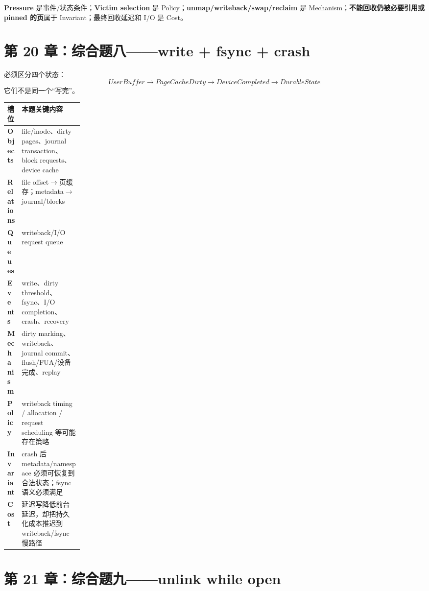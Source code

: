 \documentclass[11pt,a4paper]{ctexart}
\newcommand{\kw}[1]{\textbf{#1}}
\begin{document}
\begin{corebox}[最关键的分工]
\kw{Pressure} 是事件/状态条件；\kw{Victim selection} 是 Policy；\kw{unmap/writeback/swap/reclaim} 是 Mechanism；\kw{不能回收仍被必要引用或 pinned 的页}属于 Invariant；最终回收延迟和 I/O 是 Cost。
\end{corebox}

\section{第 20 章：综合题八——write + fsync + crash}

必须区分四个状态：
\[
\boxed{UserBuffer\rightarrow PageCacheDirty\rightarrow DeviceCompleted\rightarrow DurableState}
\]
它们不是同一个“写完”。

\begin{center}
\small
\renewcommand{\arraystretch}{1.25}
\begin{tabularx}{\linewidth}{>{\bfseries}p{0.18\linewidth} X}
\toprule
槽位 & 本题关键内容 \\
\midrule
Objects & file/inode、dirty pages、journal transaction、block requests、device cache \\
Relations & file offset$\to$页缓存；metadata$\to$journal/blocks \\
Queues & writeback/I/O request queue \\
Events & write、dirty threshold、fsync、I/O completion、crash、recovery \\
Mechanism & dirty marking、writeback、journal commit、flush/FUA/设备完成、replay \\
Policy & writeback timing / allocation / request scheduling 等可能存在策略 \\
Invariant & crash 后 metadata/namespace 必须可恢复到合法状态；fsync 语义必须满足 \\
Cost & 延迟写降低前台延迟，却把持久化成本推迟到 writeback/fsync 慢路径 \\
\bottomrule
\end{tabularx}
\end{center}

\section{第 21 章：综合题九——unlink while open}
\end{document}
